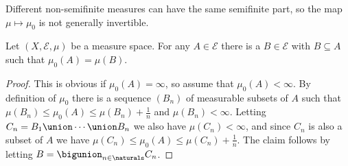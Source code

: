 \documentclass[article, a4paper, 11pt, oneside]{memoir}
\numberwithin{equation}{chapter}
\newcommand{\calE}{\mathcal{E}}
\begin{document}
Different non-semifinite measures can have the same semifinite part, so the map $\mu \mapsto \mu_0$ is not generally invertible.


\begin{lemma}
    \label{lem:semifinite-agree-with-original-measure}
    Let $(X,\calE,\mu)$ be a measure space. For any $A \in \calE$ there is a $B \in \calE$ with $B \subseteq A$ such that $\mu_0(A) = \mu(B)$.
\end{lemma}

\begin{proof}
    This is obvious if $\mu_0(A) = \infty$, so assume that $\mu_0(A) < \infty$. By definition of $\mu_0$ there is a sequence $(B_n)$ of measurable subsets of $A$ such that $\mu(B_n) \leq \mu_0(A) \leq \mu(B_n) + \tfrac{1}{n}$ and $\mu(B_n) < \infty$. Letting $C_n = B_1 \union \cdots \union B_n$ we also have $\mu(C_n) < \infty$, and since $C_n$ is also a subset of $A$ we have $\mu(C_n) \leq \mu_0(A) \leq \mu(C_n) + \tfrac{1}{n}$. The claim follows by letting $B = \bigunion_{n \in \naturals} C_n$.
\end{proof}








\end{document}
